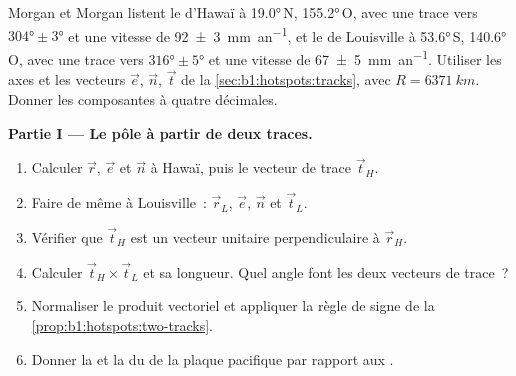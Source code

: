 \begin{problem}
\label{pb:b1:hotspots:1}
Morgan et Morgan listent le  d'Hawaï à \ang{19.0}\,N, \ang{155.2}\,O,
avec une trace vers $\ang{304}\pm\ang{3}$ et une vitesse de
\qty[uncertainty-mode=separate]{92 \pm 3}{mm.an^{-1}}, et le  de Louisville
à \ang{53.6}\,S, \ang{140.6}\,O, avec une trace vers $\ang{316}\pm\ang{5}$
et une vitesse de \qty[uncertainty-mode=separate]{67 \pm 5}{mm.an^{-1}}. Utiliser les
axes et les vecteurs $\vec e$, $\vec n$, $\vec t$ de la
\cref{sec:b1:hotspots:tracks}, avec $R = \qty{6371}{km}$. Donner les composantes à
quatre décimales.

\medskip
\noindent\textbf{Partie I --- Le pôle à partir de deux traces.}
\begin{enumerate}
  \item Calculer $\vec r$, $\vec e$ et $\vec n$ à Hawaï, puis le vecteur de
        trace $\vec t_H$.
  \item Faire de même à Louisville~: $\vec r_L$, $\vec e$, $\vec n$ et
        $\vec t_L$.
  \item Vérifier que $\vec t_H$ est un vecteur unitaire perpendiculaire à $\vec r_H$.
  \item Calculer $\vec t_H\times\vec t_L$ et sa longueur. Quel angle font les deux
        vecteurs de trace~?
  \item Normaliser le produit vectoriel et appliquer la règle de signe de la
        \cref{prop:b1:hotspots:two-tracks}.
  \item Donner la  et la  du  de la plaque pacifique
        par rapport aux .
\end{enumerate}


\end{problem}
